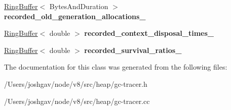 \begin{DoxyCompactItemize}
\item 
\hyperlink{classv8_1_1internal_1_1_ring_buffer}{Ring\+Buffer}$<$ Bytes\+And\+Duration $>$ {\bfseries recorded\+\_\+old\+\_\+generation\+\_\+allocations\+\_\+}\hypertarget{classv8_1_1internal_1_1_g_c_tracer_a6135d5603264b424f25812ddc173844c}{}\label{classv8_1_1internal_1_1_g_c_tracer_a6135d5603264b424f25812ddc173844c}

\item 
\hyperlink{classv8_1_1internal_1_1_ring_buffer}{Ring\+Buffer}$<$ double $>$ {\bfseries recorded\+\_\+context\+\_\+disposal\+\_\+times\+\_\+}\hypertarget{classv8_1_1internal_1_1_g_c_tracer_a70fa85f97a188d12c408023c8a3dedd7}{}\label{classv8_1_1internal_1_1_g_c_tracer_a70fa85f97a188d12c408023c8a3dedd7}

\item 
\hyperlink{classv8_1_1internal_1_1_ring_buffer}{Ring\+Buffer}$<$ double $>$ {\bfseries recorded\+\_\+survival\+\_\+ratios\+\_\+}\hypertarget{classv8_1_1internal_1_1_g_c_tracer_ac07011e5892e81f63023edda254ebf96}{}\label{classv8_1_1internal_1_1_g_c_tracer_ac07011e5892e81f63023edda254ebf96}

\end{DoxyCompactItemize}


The documentation for this class was generated from the following files\+:\begin{DoxyCompactItemize}
\item 
/\+Users/joshgav/node/v8/src/heap/gc-\/tracer.\+h\item 
/\+Users/joshgav/node/v8/src/heap/gc-\/tracer.\+cc\end{DoxyCompactItemize}

